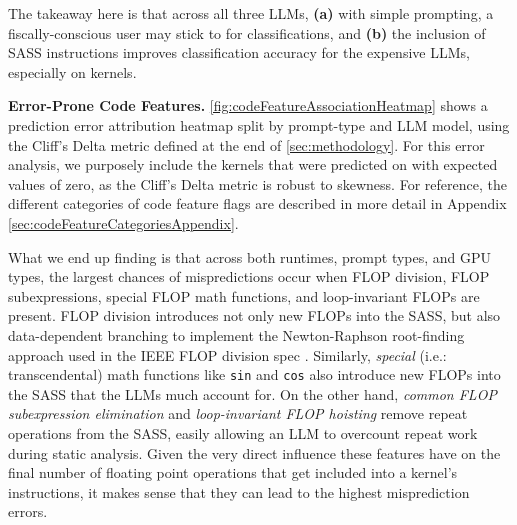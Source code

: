 The takeaway here is that across all three LLMs, \textbf{(a)} with simple \sourceonly prompting, a fiscally-conscious user may stick to \gptoss for \rai classifications, and \textbf{(b)} the inclusion of SASS instructions improves classification accuracy for the expensive LLMs, especially on \compbound kernels.






\textbf{Error-Prone Code Features.}
\autoref{fig:codeFeatureAssociationHeatmap} shows a \rai prediction error attribution heatmap split by prompt-type and LLM model, using the Cliff's Delta metric defined at the end of \autoref{sec:methodology}.
For this error analysis, we purposely include the kernels that were predicted on with expected \rai values of zero, as the Cliff's Delta metric is robust to skewness.
For reference, the different categories of code feature flags are described in more detail in Appendix \autoref{sec:codeFeatureCategoriesAppendix}.

What we end up finding is that across both runtimes, prompt types, and GPU types, the largest chances of \rai mispredictions occur when FLOP division, FLOP subexpressions, special FLOP math functions, and loop-invariant FLOPs are present.
FLOP division introduces not only new FLOPs into the SASS, but also data-dependent branching to implement the Newton-Raphson root-finding approach used in the IEEE FLOP division spec \cite{IEEEStandardFloatingPoint2019}. 
Similarly, \textit{special} (i.e.: transcendental) math functions like \texttt{sin} and \texttt{cos} also introduce new FLOPs into the SASS that the LLMs much account for.
On the other hand, \textit{common FLOP subexpression elimination} and \textit{loop-invariant FLOP hoisting} remove repeat operations from the SASS, easily allowing an LLM to overcount repeat work during static analysis.
Given the very direct influence these features have on the final number of floating point operations that get included into a kernel's instructions, it makes sense that they can lead to the highest misprediction errors.

